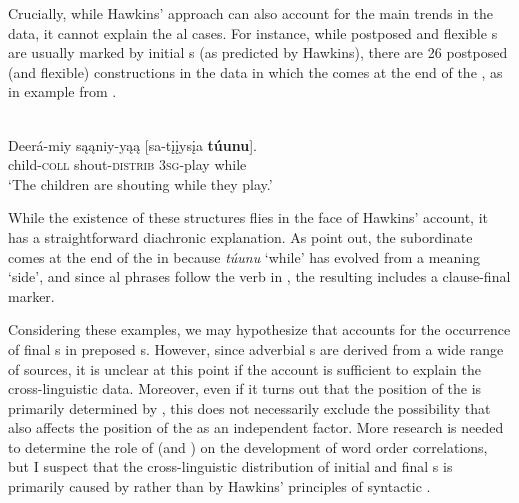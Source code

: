 \documentclass[output=paper]{langsci/langscibook}
\begin{document}
Crucially, while Hawkins’  approach can also account for the main trends in the data, it cannot explain the al cases. For instance, while postposed and flexible s are usually marked by initial s (as predicted by Hawkins), there are 26 postposed (and flexible)  constructions in the data in which the  comes at the end of the , as in example  from .

\ea\label{ex:diessel:21}
\\
\gll   Deerá-miy  sąąniy-yąą  [sa-tįįysįa  \textbf{túunu}].\\
       child-\textsc{coll}  shout-\textsc{distrib}  3\textsc{sg}-play  while\\
\glt   `The children are shouting while they play.'
\z

\noindent While the existence of these structures flies in the face of Hawkins’  account, it has a straightforward diachronic explanation. As \citet[340]{PaynePayne1990} point out, the subordinate  comes at the end of the  in  because \textit{túunu} ‘while’ has evolved from a  meaning ‘side’, and since al phrases follow the verb in , the resulting  includes a clause-final marker.\label{p:diessel:exception}

Considering these examples, we may hypothesize that  accounts for the occurrence of final s in preposed s. However, since adverbial s are derived from a wide range of sources, it is unclear at this point if the  account is sufficient to explain the cross-linguistic data. Moreover, even if it turns out that the position of the  is primarily determined by , this does not necessarily exclude the possibility that  also affects the position of the  as an independent factor. More research is needed to determine the role of  (and ) on the development of word order correlations, but I suspect that the cross-linguistic distribution of initial and final s is primarily caused by  rather than by Hawkins’ principles of syntactic .
\end{document}
